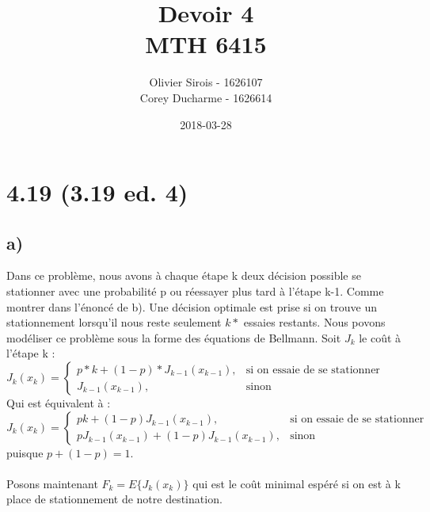 \documentclass[oneside]{book}
\title{Devoir 4 \\ MTH 6415}
\date{2018-03-28}
\author{Olivier Sirois - 1626107 \\ Corey Ducharme - 1626614}
\begin{document}
\setcounter{page}{1}
\maketitle
\section*{4.19 (3.19 ed. 4)}
\subsection*{a)}
Dans ce problème, nous avons à chaque étape k deux décision possible se stationner avec une probabilité p ou réessayer plus tard à l'étape k-1. 
Comme montrer dans l'énoncé de b). Une décision optimale est prise si on trouve un stationnement lorsqu'il nous reste seulement $k*$ essaies restants. Nous povons modéliser ce problème sous la forme des équations de Bellmann. Soit $J_k$ le coût à l'étape k :\\


\begin{math}
 J_k(x_k) = 
\begin{cases}
p*k + (1-p)*J_{k-1}(x_{k-1}), & \text{si on essaie de se stationner} \\
J_{k-1}(x_{k-1}), & \text{sinon}
\end{cases}
\end{math}\\


Qui est équivalent à :\\

\begin{math}
J_k(x_k) = 
\begin{cases}
pk + (1-p)J_{k-1}(x_{k-1}), & \text{si on essaie de se stationner} \\
pJ_{k-1}(x_{k-1}) + (1-p)J_{k-1}(x_{k-1}), & \text{sinon }
\end{cases}
\end{math}\\

puisque $p + (1-p) = 1$.
\\\\
Posons maintenant $F_k = E\{J_k(x_k)\}$ qui est le coût minimal espéré si on est à k place de stationnement de notre destination. 
\end{document}
